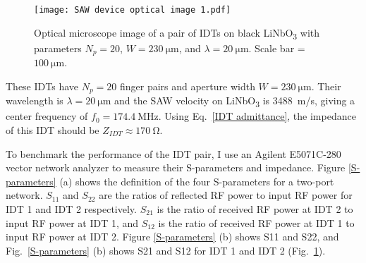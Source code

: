 \documentclass[double,12pt,1in,seploa]{beavtex}
\begin{document}
\begin{figure}
    \texttt{[image: SAW device optical image 1.pdf]}
    \caption{Optical microscope image of a pair of IDTs on black LiNbO\textsubscript{3} with parameters $N_p = 20$, $W = \SI{230}{\micro\meter}$, and $\lambda = \SI{20}{\micro\meter}$. Scale bar = $\SI{100}{\micro\meter}$.}
    \label{SAW device optical image with measurements}
\end{figure}
These IDTs have $N_p = 20$ finger pairs and aperture width $W = \SI{230}{\micro\meter}$. Their wavelength is $\lambda = \SI{20}{\micro\meter}$ and the SAW velocity on LiNbO\textsubscript{3} is \SI{3488}{\meter/\second}, giving a center frequency of $f_0 = \SI{174.4}{\mega\hertz}$. Using Eq.\ \ref{IDT admittance}, the impedance of this IDT should be $Z_{IDT} \approx \SI{170}{\ohm}$. 

To benchmark the performance of the IDT pair, I use an Agilent E5071C-280 vector network analyzer to measure their S-parameters and impedance. Figure \ref{S-parameters} (a) shows the definition of the four S-parameters for a two-port network. $S_{11}$ and $S_{22}$ are the ratios of reflected RF power to input RF power for IDT 1 and IDT 2 respectively. $S_{21}$ is the ratio of received RF power at IDT 2 to input RF power at IDT 1, and $S_{12}$ is the ratio of received RF power at IDT 1 to input RF power at IDT 2. Figure \ref{S-parameters} (b) shows S11 and S22, and Fig.\ \ref{S-parameters} (b) shows S21 and S12 for IDT 1 and IDT 2 (Fig.\ \ref{SAW device optical image with measurements}).
\end{document}
